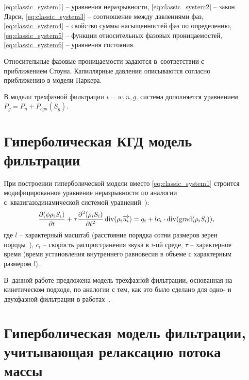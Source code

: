 \eqref{eq:classic_system1} -- уравнения неразрывности,
\eqref{eq:classic_system2} -- закон Дарси,
\eqref{eq:classic_system3} -- соотношение между давлениями фаз,
\eqref{eq:classic_system4} -- свойство суммы насыщенностей фаз по определению,
\eqref{eq:classic_system5} -- функции относительных фазовых проницаемостей,
\eqref{eq:classic_system6} -- уравнения состояния.

Относительные фазовые проницаемости задаются в~соответствии с~
приближением Стоуна\cite{Aziz-Settari}.
Капиллярные давления описываются согласно приближению в модели Паркера\cite{Parker}.

В модели трехфазной фильтрации $i = w,n,g$, система дополняется уравнением $P_g = P_n + P_{cgn}({S}_g)$.

\section{Гиперболическая КГД модель фильтрации} \label{sec:ch1/sec2}

При построении гиперболической модели вместо \eqref{eq:classic_system1} строится модифицированное уравнение неразрывности по аналогии с~квазигазодинамической системой уравнений~\cite{Chetverushkin-Mathmod}):
\begin{equation}
 \label{mass_mod}
  \frac{\partial (\phi \rho_i S_i)}{\partial t} + \tau \frac{\partial^2 (\rho_i S_i)}{\partial t^2}
  \mathop{\mathrm{div}}\nolimits(\rho_i \overrightarrow{u_i}) = q_i + l c_i \cdot \mathop{\mathrm{div}}\nolimits(\mathop{\mathrm{grad}}\nolimits(\rho_i S_i)),
\end{equation}
где $l$ -- характерный масштаб (расстояние порядка сотни размеров зерен породы~\cite{Chetverushkin}),
$c_i$ -- скорость распространения звука в $i$-ой среде, $\tau$ -- характерное время (время установления внутреннего равновесия в объеме с характерным размером $l$).

В~данной работе предложена модель трехфазной фильтрации, основанная на кинетическом подходе, по аналогии с тем, как это было сделано для одно- и двухфазной фильтрации в работах~\cite{Mathmod-2010,Mathmod-2011}.

\section{Гиперболическая модель фильтрации, учитывающая релаксацию потока массы} \label{sec:ch1/sec3}


